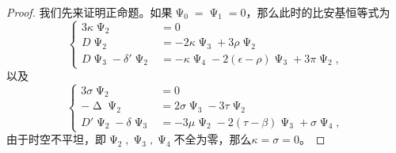 \begin{proof}
	我们先来证明正命题。如果$\upPsi _{0} =\upPsi _{1} =0$，那么此时的比安基恒等式为
	\begin{equation*}
		\begin{cases}
			3\kappa \upPsi _{2} & =0\\
			D\upPsi _{2} & =-2\kappa \upPsi _{3} +3\rho \upPsi _{2}\\
			D\upPsi _{3} -\delta '\upPsi _{2} & =-\kappa \upPsi _{4} -2( \epsilon -\rho ) \upPsi _{3} +3\pi \upPsi _{2} ,
		\end{cases}
	\end{equation*}
	以及
	\begin{equation*}
		\begin{cases}
			3\sigma \upPsi _{2} & =0\\
			-\upDelta \upPsi _{2} & =2\sigma \upPsi _{3} -3\tau \upPsi _{2}\\
			D'\upPsi _{2} -\delta \upPsi _{3} & =-3\mu \upPsi _{2} -2( \tau -\beta ) \upPsi _{3} +\sigma \upPsi _{4} ,
		\end{cases}
	\end{equation*}
	由于时空不平坦，即$\upPsi _{2} ,\upPsi _{3} ,\upPsi _{4}$不全为零，那么$\kappa =\sigma =0$。
	
	
	

\end{proof}
